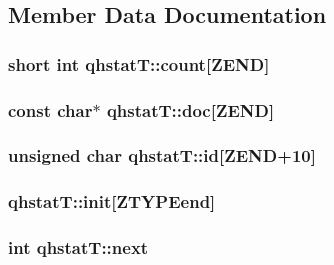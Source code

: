 \subsection{Member Data Documentation}
\hypertarget{structqhstatT_a57e528b84cdf2ab8ce962b82c210d9f7}{}
\subsubsection[{count}]{\setlength{\rightskip}{0pt plus 5cm}short int qhstat\+T\+::count\mbox{[}{\bf Z\+E\+N\+D}\mbox{]}}\label{structqhstatT_a57e528b84cdf2ab8ce962b82c210d9f7}
\hypertarget{structqhstatT_a15218d42b7a84251f44a667cd21484b4}{}
\subsubsection[{doc}]{\setlength{\rightskip}{0pt plus 5cm}const char$\ast$ qhstat\+T\+::doc\mbox{[}{\bf Z\+E\+N\+D}\mbox{]}}\label{structqhstatT_a15218d42b7a84251f44a667cd21484b4}
\hypertarget{structqhstatT_aa05bc1cbbe3702df082daa7556f069d7}{}
\subsubsection[{id}]{\setlength{\rightskip}{0pt plus 5cm}unsigned char qhstat\+T\+::id\mbox{[}{\bf Z\+E\+N\+D}+10\mbox{]}}\label{structqhstatT_aa05bc1cbbe3702df082daa7556f069d7}
\hypertarget{structqhstatT_a3c16ecdc2010f168040b936cdb801756}{}
\subsubsection[{init}]{ qhstat\+T\+::init\mbox{[}{\bf Z\+T\+Y\+P\+Eend}\mbox{]}}\label{structqhstatT_a3c16ecdc2010f168040b936cdb801756}
\hypertarget{structqhstatT_a27d020e3dadf203e6d5b791b42589456}{}
\subsubsection[{next}]{\setlength{\rightskip}{0pt plus 5cm}int qhstat\+T\+::next}\label{structqhstatT_a27d020e3dadf203e6d5b791b42589456}
\hypertarget{structqhstatT_ac74817d4cf3646f45952d03e22ad2d48}{}
